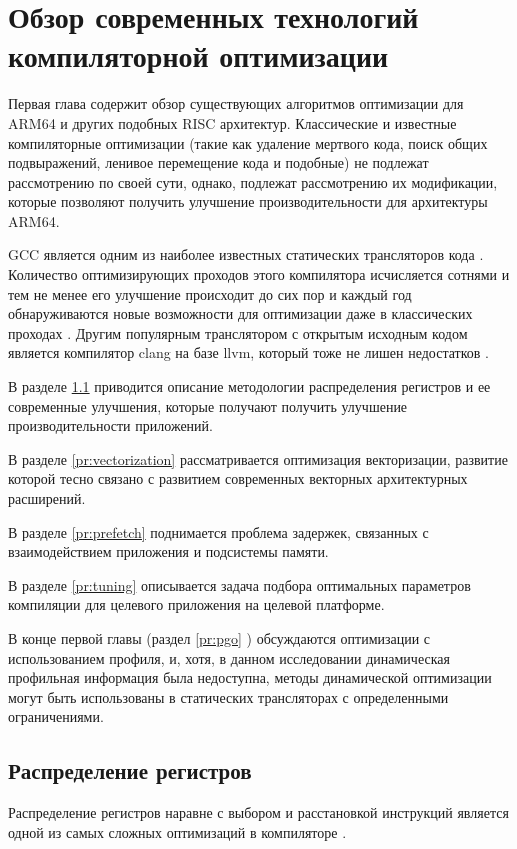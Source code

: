 \chapter{Обзор современных технологий компиляторной оптимизации}\label{ch:chReview}
Первая глава содержит обзор существующих алгоритмов оптимизации для ARM64 и других  подобных  RISC архитектур. Классические и известные компиляторные оптимизации (такие как удаление мертвого кода, поиск общих подвыражений, ленивое перемещение кода и подобные) не подлежат рассмотрению по своей сути, однако, подлежат рассмотрению их модификации, которые позволяют получить улучшение производительности для архитектуры ARM64. 

GCC является одним из наиболее известных статических трансляторов кода \cite{gough2004introduction}. Количество оптимизирующих проходов этого компилятора исчисляется сотнями и тем не менее его улучшение происходит до сих пор и каждый год обнаруживаются новые возможности для оптимизации даже в классических проходах \cite{theodoridis2022finding}. Другим популярным транслятором с открытым исходным кодом является  компилятор clang на базе llvm, который тоже не лишен недостатков \cite{zhou2021empirical}.

В разделе \ref{pr:regalloc} приводится описание методологии распределения регистров и ее современные улучшения, которые получают получить улучшение производительности приложений.

В разделе \ref{pr:vectorization} рассматривается оптимизация векторизации, развитие которой тесно связано с развитием современных векторных архитектурных расширений.

В разделе \ref{pr:prefetch} поднимается проблема задержек, связанных с  взаимодействием приложения и подсистемы памяти.

В разделе \ref{pr:tuning} описывается задача подбора оптимальных параметров компиляции для целевого приложения на целевой платформе.

В конце первой главы (раздел \ref{pr:pgo} ) обсуждаются оптимизации с использованием профиля, и, хотя, в данном исследовании динамическая профильная информация была недоступна, методы динамической оптимизации могут быть использованы в статических трансляторах с определенными ограничениями.

\section{Распределение регистров} \label{pr:regalloc}
Распределение регистров наравне с выбором и расстановкой инструкций является одной из самых сложных оптимизаций в компиляторе \cite{lozano2019survey, alfred2007compilers}. 

